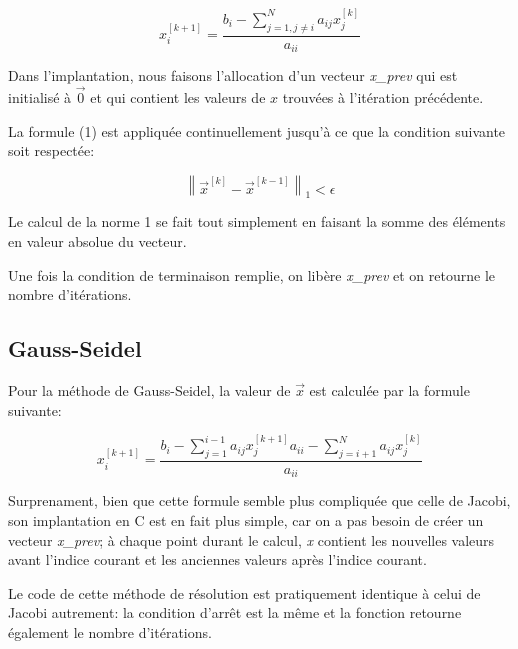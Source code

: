 \documentclass[10pt]{article}
\begin{document}
\[
x_i^{[k+1]} = \frac{b_i - \sum_{j=1, j \ne i}^N
  a_{ij}x_j^{[k]}}{a_{ii}} \tag{1}
\]

Dans l'implantation, nous faisons l'allocation d'un vecteur
\emph{x\_prev} qui est initialisé à $\vec{0}$ et qui contient les
valeurs de $x$ trouvées à l'itération précédente.

La formule (1) est appliquée continuellement jusqu'à ce que la
condition suivante soit respectée:

\[
\left\| \vec{x}^{[k]} - \vec{x}^{[k-1]} \right\|_1 < \epsilon
\]

Le calcul de la norme 1 se fait tout simplement en faisant la somme
des éléments en valeur absolue du vecteur.

Une fois la condition de terminaison remplie, on libère
\emph{x\_prev} et on retourne le nombre d'itérations.

\subsection{Gauss-Seidel}

Pour la méthode de Gauss-Seidel, la valeur de $\vec{x}$ est calculée
par la formule suivante:

\[
x_i^{[k+1]} = \frac{b_i - \sum_{j=1}^{i-1}
  a_{ij}x_j^{[k+1]}{a_{ii}} - \sum_{j=i+1}^{N}
  a_{ij}x_j^{[k]}}{a_{ii}}  \tag{2}
\]

Surprenament, bien que cette formule semble plus compliquée que celle
de Jacobi, son implantation en C est en fait plus simple, car on a pas
besoin de créer un vecteur \emph{x\_prev}; à chaque point durant le
calcul, \emph{x} contient les nouvelles valeurs avant l'indice courant
et les anciennes valeurs après l'indice courant.

Le code de cette méthode de résolution est pratiquement identique à
celui de Jacobi autrement: la condition d'arrêt est la même et la
fonction retourne également le nombre d'itérations.
\end{document}
